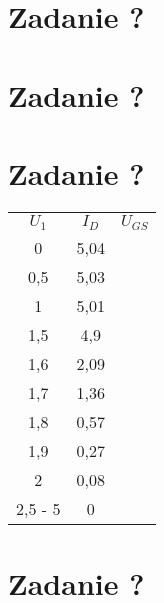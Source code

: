 \documentclass[polish,a4paper]{article}
\begin{document}
\section{Zadanie ?}


\section{Zadanie ?}

\section{Zadanie ?}


\begin{center}
\begin{tabular}{|c|c|c|}
\hline
\textbf{$U_1 $} & \textbf{$I_D $} & \textbf{$U_{GS}$}\\
\hhline{|=|=|=]}
0 & 5,04 & \\
\hline
0,5 & 5,03 & \\
\hline
1 & 5,01 & \\
\hline
1,5 & 4,9 & \\
\hline
1,6 & 2,09 & \\
\hline
1,7 & 1,36 & \\
\hline
1,8 & 0,57 & \\
\hline
1,9 & 0,27 & \\
\hline
2 & 0,08 & \\
\hline
2,5 - 5 & 0 & \\
\hline

\end{tabular}
\end{center}

\section{Zadanie ?}
\end{document}
